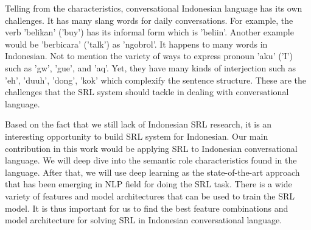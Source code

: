 Telling from the characteristics, conversational Indonesian language has its own challenges. It has many slang words for daily conversations. For example, the verb 'belikan' ('buy') has its informal form which is 'beliin'. Another example would be 'berbicara' ('talk') as 'ngobrol'. It happens to many words in Indonesian. Not to mention the variety of ways to express pronoun 'aku' ('I') such as 'gw', 'gue', and 'aq'. Yet, they have many kinds of interjection such as 'eh', 'duuh', 'dong', 'kok' which complexify the sentence structure. These are the challenges that the SRL system should tackle in dealing with conversational language.

Based on the fact that we still lack of Indonesian SRL research, it is an interesting opportunity to build SRL system for Indonesian. Our main contribution in this work would be applying SRL to Indonesian conversational language. We will deep dive into the semantic role characteristics found in the language. After that, we will use deep learning as the state-of-the-art approach that has been emerging in NLP field for doing the SRL task. There is a wide variety of features and model architectures that can be used to train the SRL model. It is thus important for us to find the best feature combinations and model architecture for solving SRL in Indonesian conversational language.



